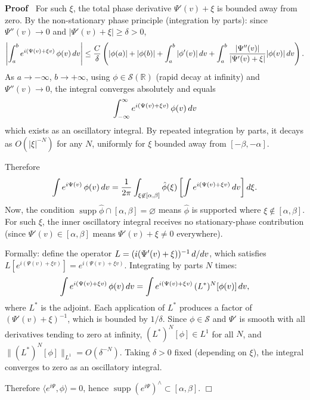\documentclass{article}
\newcommand{\nin}{\not\in}
\newcommand{\tmop}[1]{\ensuremath{\operatorname{#1}}}
\newenvironment{proof}{\noindent\textbf{Proof\ }}{\hspace*{\fill}$\Box$\medskip}
\newcommand{\supp}{\tmop{supp}}
\begin{document}
\begin{proof}
  For such $\xi$, the total phase derivative $\Psi' (v) + \xi$ is bounded away
  from zero. By the non-stationary phase principle (integration by parts):
  since $\Psi'' (v) \to 0$ and $| \Psi' (v) + \xi | \ge \delta > 0$,
  \[ \left| \int_a^b e^{i (\Psi (v) + \xi v)}  \hspace{0.17em} \phi (v)
     \hspace{0.17em} dv \right| \le \frac{C}{\delta}  \left( | \phi (a) | + |
     \phi (b) | + \int_a^b | \phi' (v) | \hspace{0.17em} dv + \int_a^b \frac{|
     \Psi'' (v) |}{| \Psi' (v) + \xi |} | \phi (v) | \hspace{0.17em} dv
     \right) . \]
  As $a \to - \infty$, $b \to + \infty$, using $\phi \in \mathcal{S}
  (\mathbb{R})$ (rapid decay at infinity) and $\Psi'' (v) \to 0$, the integral
  converges absolutely and equals
  \[ \int_{- \infty}^{\infty} e^{i (\Psi (v) + \xi v)}  \hspace{0.17em} \phi
     (v)  \hspace{0.17em} dv \]
  which exists as an oscillatory integral. By repeated integration by parts,
  it decays as $O (| \xi |^{- N})$ for any $N$, uniformly for $\xi$ bounded
  away from $[- \beta, - \alpha]$.
  
  Therefore
  \[ \int e^{i \Psi (v)}  \hspace{0.17em} \phi (v)  \hspace{0.17em} dv =
     \frac{1}{2 \pi}  \int_{\xi \nin [\alpha, \beta]} \hat{\phi} (\xi) \left[
     \int e^{i (\Psi (v) + \xi v)}  \hspace{0.17em} dv \right] d \xi . \]
  Now, the condition $\supp \hat{\phi} \cap [\alpha, \beta] = \varnothing$
  means $\hat{\phi}$ is supported where $\xi \nin [\alpha, \beta]$. For such
  $\xi$, the inner oscillatory integral receives no stationary-phase
  contribution (since $\Psi' (v) \in [\alpha, \beta]$ means $\Psi' (v) + \xi
  \ne 0$ everywhere).
  
  Formally: define the operator $L = (i (\Psi' (v) + \xi))^{- 1} 
  \hspace{0.17em} d / dv$, which satisfies $L [e^{i (\Psi (v) + \xi v)}] =
  e^{i (\Psi (v) + \xi v)}$. Integrating by parts $N$ times:
  \[ \int e^{i (\Psi (v) + \xi v)}  \hspace{0.17em} \phi (v)  \hspace{0.17em}
     dv = \int e^{i (\Psi (v) + \xi v)} \hspace{0.17em} (L^{\ast})^N [\phi
     (v)]  \hspace{0.17em} dv, \]
  where $L^{\ast}$ is the adjoint. Each application of $L^{\ast}$ produces a
  factor of $(\Psi' (v) + \xi)^{- 1}$, which is bounded by $1 / \delta$. Since
  $\phi \in \mathcal{S}$ and $\Psi'$ is smooth with all derivatives tending to
  zero at infinity, $(L^{\ast})^N [\phi] \in L^1$ for all $N$, and
  $\|(L^{\ast})^N [\phi]\|_{L^1} = O (\delta^{- N})$. Taking $\delta > 0$
  fixed (depending on $\xi$), the integral converges to zero as an oscillatory
  integral.
  
  Therefore $\langle e^{i \Psi}, \phi \rangle = 0$, hence $\supp (e^{i
  \Psi})^{\wedge} \subset [\alpha, \beta]$.
\end{proof}
\end{document}
